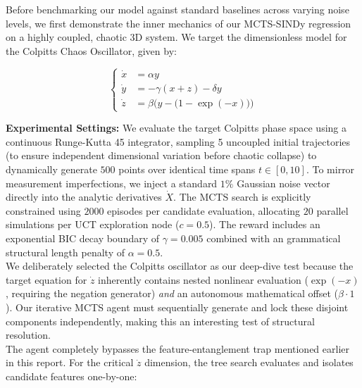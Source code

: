 \documentclass[11pt, a4paper]{article}
\begin{document}
Before benchmarking our model against standard baselines across varying noise levels, we first demonstrate the inner mechanics of our MCTS-SINDy regression on a highly coupled, chaotic 3D system. We target the dimensionless model for the Colpitts Chaos Oscillator, given by:

\begin{equation}
    \left\{\begin{array}{lll}
            \dot{x} &= \alpha y \\
        \dot{y} &= -\gamma (x + z) - \delta y \\
        \dot{z} &= \beta \Big(y - \big(1 - \exp(-x)\big)\Big)
    \end{array}\right.
\end{equation}


\textbf{Experimental Settings:} We evaluate the target Colpitts phase space using a continuous Runge-Kutta 45 integrator, sampling 5 uncoupled initial trajectories (to ensure independent dimensional variation before chaotic collapse) to dynamically generate $500$ points over identical time spans $t \in [0, 10]$. To mirror measurement imperfections, we inject a standard $1\%$ Gaussian noise vector directly into the analytic derivatives $\dot{X}$. The MCTS search is explicitly constrained using $2000$ episodes per candidate evaluation, allocating $20$ parallel simulations per UCT exploration node ($c=0.5$). The reward includes an exponential BIC decay boundary of $\gamma=0.005$ combined with an grammatical structural length penalty of $\alpha=0.5$.\\

We deliberately selected the Colpitts oscillator as our deep-dive test because the target equation for $\dot{z}$ inherently contains nested nonlinear evaluation ($\exp(-x)$, requiring the negation generator) \textit{and} an autonomous mathematical offset ($\beta \cdot 1$). Our iterative MCTS agent must sequentially generate and lock these disjoint components independently, making this an interesting test of structural resolution.\\

The agent completely bypasses the feature-entanglement trap mentioned earlier in this report. For the critical $\dot{z}$ dimension, the tree search evaluates and isolates candidate features one-by-one:
\end{document}
